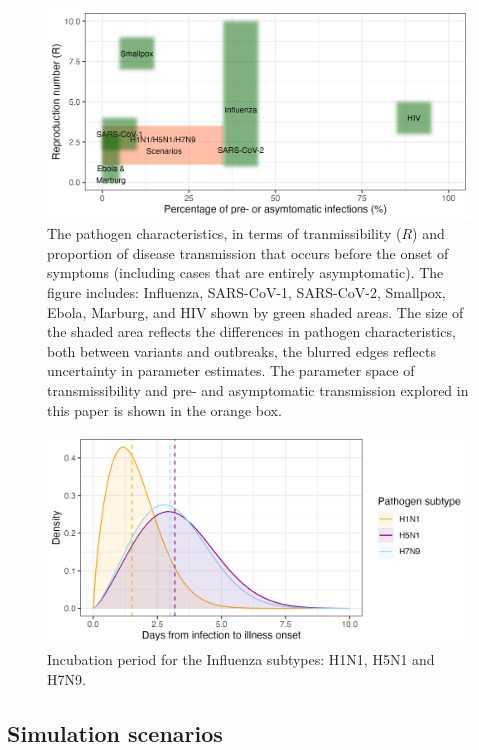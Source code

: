 \documentclass{article}
\begin{document}
\begin{figure}[ht]
\centering
\includegraphics[width=\textwidth]{../plots/patho_param_space.png}
\caption{The pathogen characteristics, in terms of tranmissibility ($R$) and proportion of disease transmission that occurs before the onset of symptoms (including cases that are entirely asymptomatic). The figure includes: Influenza, SARS-CoV-1, SARS-CoV-2, Smallpox, Ebola, Marburg, and HIV shown by green shaded areas. The size of the shaded area reflects the differences in pathogen characteristics, both between variants and outbreaks, the blurred edges reflects uncertainty in parameter estimates. The parameter space of transmissibility and pre- and asymptomatic transmission explored in this paper is shown in the orange box.}
\label{fig:patho-param-space}
\end{figure}

\begin{figure}[ht]
\centering
\includegraphics[width=\textwidth]{../plots/incubation_period.png}
\caption{Incubation period for the Influenza subtypes: H1N1, H5N1 and H7N9.}
\label{fig:incub}
\end{figure}

\clearpage

\subsection*{Simulation scenarios}
\end{document}
